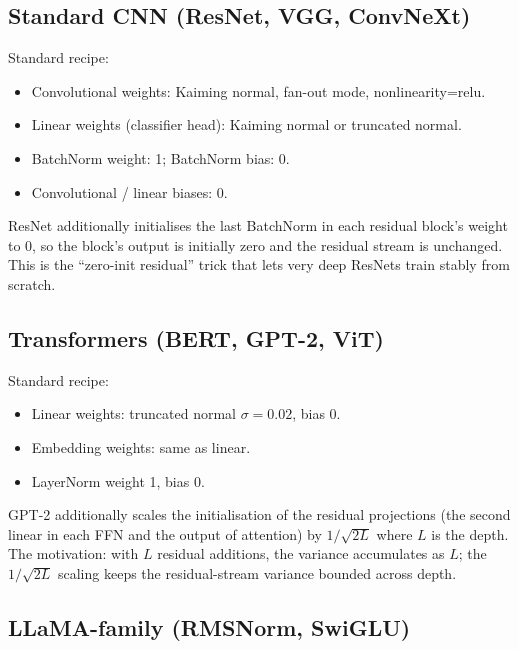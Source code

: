 \subsection{Standard CNN (ResNet, VGG, ConvNeXt)}
\label{ssec:initialization:cnn_recipe}

Standard recipe:
\begin{itemize}
  \item Convolutional weights: Kaiming normal, fan-out mode,
    nonlinearity=relu.
  \item Linear weights (classifier head): Kaiming normal or
    truncated normal.
  \item BatchNorm weight: 1; BatchNorm bias: 0.
  \item Convolutional / linear biases: 0.
\end{itemize}

ResNet \cite{he_resnet_2016} additionally initialises the last
BatchNorm in each residual block's weight to 0, so the block's
output is initially zero and the residual stream is unchanged.
This is the ``zero-init residual'' trick that lets very deep
ResNets train stably from scratch.

\subsection{Transformers (BERT, GPT-2, ViT)}
\label{ssec:initialization:transformer_recipe}

Standard recipe:
\begin{itemize}
  \item Linear weights: truncated normal $\sigma = 0.02$,
    bias 0.
  \item Embedding weights: same as linear.
  \item LayerNorm weight 1, bias 0.
\end{itemize}

GPT-2 \cite{radford_gpt2_2019} additionally scales the
initialisation of the residual projections (the second
linear in each FFN and the output of attention) by
$1/\sqrt{2 L}$ where $L$ is the depth. The motivation: with $L$
residual additions, the variance accumulates as $L$; the
$1/\sqrt{2L}$ scaling keeps the residual-stream variance
bounded across depth.

\subsection{LLaMA-family (RMSNorm, SwiGLU)}
\label{ssec:initialization:llama_recipe}

